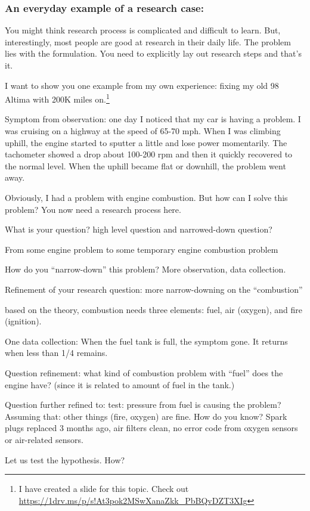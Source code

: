 \documentclass[11pt]{article}
\begin{document}
\subsubsection{An everyday example of a research case:}
You might think research process is complicated and difficult to learn.
But, interestingly, most people are good at research in their daily
life. The problem lies with the formulation. You need to explicitly lay
out research steps and that's it.

I want to show you one example from my own experience: fixing my old 98 Altima
with 200K miles on.\footnote{I have created a slide for this topic. Check out
\url{https://1drv.ms/p/s!At3pok2MSwXanaZkk_PbBQvDZT3XIg}}
 
Symptom from observation: one day I noticed that my car is having a problem. I
was cruising on a highway at the speed of 65-70 mph. When I was climbing
uphill, the engine started to sputter a little and lose power momentarily. The
tachometer showed a drop about 100-200 rpm and then it quickly recovered to
the normal level. When the uphill became flat or downhill, the problem went
away.

Obviously, I had a problem with engine combustion. But how can I solve this
problem? You now need a research process here.

What is your question? high level question and narrowed-down question?

From some engine problem to some temporary engine combustion problem 

How do you ``narrow-down'' this problem? More observation, data collection.

Refinement of your research question: more narrow-downing on the
``combustion''

based on the theory, combustion needs three elements: fuel, air (oxygen), and
fire (ignition).

One data collection: When the fuel tank is full, the symptom gone. It returns
when less than 1/4 remains.

Question refinement: what kind of combustion problem with ``fuel'' does the
engine have? (since it is related to amount of fuel in the tank.)

Question further refined to: test: pressure from fuel is causing the problem?
Assuming that: other things (fire, oxygen) are fine. How do you know? Spark
plugs replaced 3 months ago, air filters clean, no error code from oxygen
sensors or air-related sensors.

Let us test the hypothesis. How?
\end{document}
